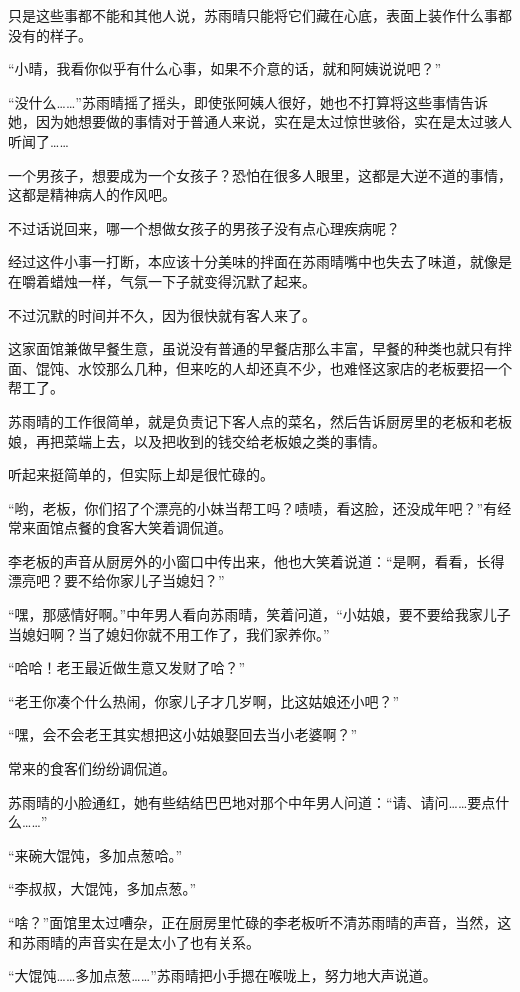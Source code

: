 只是这些事都不能和其他人说，苏雨晴只能将它们藏在心底，表面上装作什么事都没有的样子。

“小晴，我看你似乎有什么心事，如果不介意的话，就和阿姨说说吧？”

“没什么……”苏雨晴摇了摇头，即使张阿姨人很好，她也不打算将这些事情告诉她，因为她想要做的事情对于普通人来说，实在是太过惊世骇俗，实在是太过骇人听闻了……

一个男孩子，想要成为一个女孩子？恐怕在很多人眼里，这都是大逆不道的事情，这都是精神病人的作风吧。

不过话说回来，哪一个想做女孩子的男孩子没有点心理疾病呢？

经过这件小事一打断，本应该十分美味的拌面在苏雨晴嘴中也失去了味道，就像是在嚼着蜡烛一样，气氛一下子就变得沉默了起来。

不过沉默的时间并不久，因为很快就有客人来了。

这家面馆兼做早餐生意，虽说没有普通的早餐店那么丰富，早餐的种类也就只有拌面、馄饨、水饺那么几种，但来吃的人却还真不少，也难怪这家店的老板要招一个帮工了。

苏雨晴的工作很简单，就是负责记下客人点的菜名，然后告诉厨房里的老板和老板娘，再把菜端上去，以及把收到的钱交给老板娘之类的事情。

听起来挺简单的，但实际上却是很忙碌的。

“哟，老板，你们招了个漂亮的小妹当帮工吗？啧啧，看这脸，还没成年吧？”有经常来面馆点餐的食客大笑着调侃道。

李老板的声音从厨房外的小窗口中传出来，他也大笑着说道：“是啊，看看，长得漂亮吧？要不给你家儿子当媳妇？”

“嘿，那感情好啊。”中年男人看向苏雨晴，笑着问道，“小姑娘，要不要给我家儿子当媳妇啊？当了媳妇你就不用工作了，我们家养你。”

“哈哈！老王最近做生意又发财了哈？”

“老王你凑个什么热闹，你家儿子才几岁啊，比这姑娘还小吧？”

“嘿，会不会老王其实想把这小姑娘娶回去当小老婆啊？”

常来的食客们纷纷调侃道。

苏雨晴的小脸通红，她有些结结巴巴地对那个中年男人问道：“请、请问……要点什么……”

“来碗大馄饨，多加点葱哈。”

“李叔叔，大馄饨，多加点葱。”

“啥？”面馆里太过嘈杂，正在厨房里忙碌的李老板听不清苏雨晴的声音，当然，这和苏雨晴的声音实在是太小了也有关系。

“大馄饨……多加点葱……”苏雨晴把小手摁在喉咙上，努力地大声说道。

